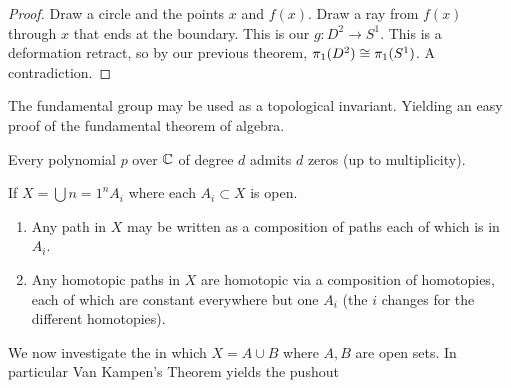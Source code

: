 \documentclass[11pt,leqno,oneside]{amsart}
\newenvironment{dateenv}{
  \vspace{1em}
}{
  \vspace{1em}
}
\newcommand{\mydate}[4]{
  \newdate{#1}{#2}{#3}{#4}
  \begin{dateenv}
    \hfill\displaydate{#1}
  \end{dateenv}
}
\numberwithin{thm}{section}
\newcommand{\fund}{\pi_1}
\begin{document}
\begin{proof}
  Draw a circle and the points $x$ and $f(x)$.  Draw a ray from $f(x)$
  through $x$ that ends at the boundary.  This is our
  $g\colon D^2 \to S^1$.  This is a deformation retract, so by our
  previous theorem, $\fund(D^2) \isom \fund(S^1)$.  A contradiction.
\end{proof}


\mydate{d5}{3}{1}{2017}

The fundamental group may be used as a topological invariant. Yielding
an easy proof of the fundamental theorem of algebra.

\begin{thm}
  Every polynomial \(p\) over \({\mathbb C}\) of degree \(d\) admits \(d\)
  zeros (up to multiplicity).
\end{thm}

\begin{thm}
  If \(X= \bigcup{n=1}^n {A_i}\) where each \(A_i \subset X\) is open.
  \begin{enumerate}[label=(\alph*)]
  \item Any path in \(X\) may be written as a composition of paths
    each of which is in \(A_i\).
  \item Any homotopic paths in \(X\) are homotopic via a composition
    of homotopies, each of which are constant everywhere but one
    \(A_i\) (the \(i\) changes for the different homotopies).
  \end{enumerate}
\end{thm}

We now investigate the in which \(X=A \cup B\) where \(A,B\) are open sets. In particular Van Kampen's Theorem yields the pushout

\begin{center}
\end{center}

\mydate{d6}{3}{2}{2017}
\end{document}
